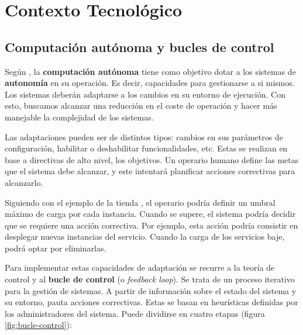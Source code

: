 \chapter{Contexto Tecnológico}
\label{chap:contexto_tecnologico}

\section{Computación autónoma y bucles de control}

Según \cite{ibmcorporationArchitecturalBlueprintAutonomic2006}, la \textbf{computación autónoma} tiene como objetivo dotar a los sistemas de \textbf{autonomía} en su operación. Es decir, capacidades para gestionarse a si mismos. Los sistemas deberán adaptarse a los cambios en su entorno de ejecución. Con esto, buscamos alcanzar una reducción en el coste de operación y hacer más manejable la complejidad de los sistemas.

Las adaptaciones pueden ser de distintos tipos: cambios en sus parámetros de configuración, habilitar o deshabilitar funcionalidades, etc. Estas se realizan en base a directivas de alto nivel, los objetivos. Un operario humano define las metas que el sistema debe alcanzar, y este intentará planificar acciones correctivas para alcanzarlo.

Siguiendo con el ejemplo de la tienda , el operario podría definir un umbral máximo de carga por cada instancia. Cuando se supere, el sistema podría decidir que se requiere una acción correctiva. Por ejemplo, esta acción podría consistir en desplegar nuevas instancias del servicio. Cuando la carga de los servicios baje, podrá optar por eliminarlas.

Para implementar estas capacidades de adaptación se recurre a la teoría de control y al \textbf{bucle de control} (o \emph{feedback loop}). \cite{brunEngineeringSelfAdaptiveSystems2009} Se trata de un proceso iterativo para la gestión de sistemas. A partir de información sobre el estado del sistema y su entorno, pauta acciones correctivas. Estas se basan en heurísticas definidas por los administradores del sistema. Puede dividirse en cuatro etapas (figura \ref{fig:bucle-control}):


